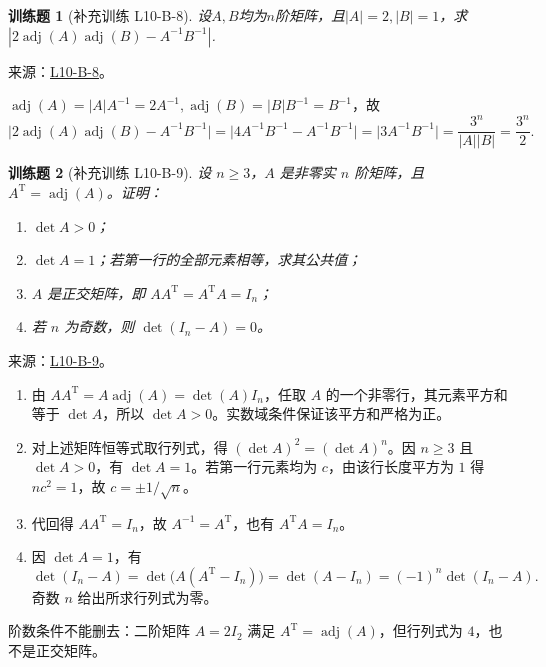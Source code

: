 \documentclass[12pt,fontset=fandol]{ctexart}
\newtheorem{exercise}{训练题}[section]
\begin{document}
\begin{exercise}[补充训练 L10-B-8]\label{prob:L10-B-8}
设$A,B$均为$n$阶矩阵，且$|A|=2,|B|=1$，求$|2\operatorname{adj}(A)\operatorname{adj}(B)-A^{-1}B^{-1}|$.
\end{exercise}
\noindent 来源：\href{https://github.com/yhwu-is/Linear-Algebra-Left-Undone/blob/new/%E8%AE%B2%E4%B9%89/%E4%B8%93%E9%A2%98/10%20%E8%A1%8C%E5%88%97%E5%BC%8F.tex}{L10-B-8}。
\begin{solve}
$\operatorname{adj}(A) = \lvert A \rvert A^{-1} = 2A^{-1}, \operatorname{adj}(B) = \lvert B \rvert B^{-1} = B^{-1}$，故 \[\lvert 2\operatorname{adj}(A)\operatorname{adj}(B)-A^{-1}B^{-1} \rvert = \lvert 4A^{-1}B^{-1}-A^{-1}B^{-1} \rvert = \lvert 3A^{-1}B^{-1} \rvert = \dfrac{3^n}{\lvert A \rvert \lvert B \rvert} = \dfrac{3^n}{2}.\]
\end{solve}

\begin{exercise}[补充训练 L10-B-9]\label{prob:L10-B-9}
设 $n\ge3$，$A$ 是非零实 $n$ 阶矩阵，且 $A^{\mathrm T}=\operatorname{adj}(A)$。证明：
\begin{enumerate}
\item $\det A>0$；
\item $\det A=1$；若第一行的全部元素相等，求其公共值；
\item $A$ 是正交矩阵，即 $AA^{\mathrm T}=A^{\mathrm T}A=I_n$；
\item 若 $n$ 为奇数，则 $\det(I_n-A)=0$。
\end{enumerate}
\end{exercise}
\noindent 来源：\href{https://github.com/yhwu-is/Linear-Algebra-Left-Undone/blob/new/%E8%AE%B2%E4%B9%89/%E4%B8%93%E9%A2%98/10%20%E8%A1%8C%E5%88%97%E5%BC%8F.tex}{L10-B-9}。
\begin{solve}
\begin{enumerate}
\item 由 $AA^{\mathrm T}=A\operatorname{adj}(A)=\det(A)I_n$，任取 $A$ 的一个非零行，其元素平方和等于 $\det A$，所以 $\det A>0$。实数域条件保证该平方和严格为正。
\item 对上述矩阵恒等式取行列式，得 $(\det A)^2=(\det A)^n$。因 $n\ge3$ 且 $\det A>0$，有 $\det A=1$。若第一行元素均为 $c$，由该行长度平方为 $1$ 得 $nc^2=1$，故 $c=\pm1/\sqrt n$。
\item 代回得 $AA^{\mathrm T}=I_n$，故 $A^{-1}=A^{\mathrm T}$，也有 $A^{\mathrm T}A=I_n$。
\item 因 $\det A=1$，有
\[\det(I_n-A)=\det\bigl(A(A^{\mathrm T}-I_n)\bigr)=\det(A-I_n)=(-1)^n\det(I_n-A).\]
奇数 $n$ 给出所求行列式为零。
\end{enumerate}
阶数条件不能删去：二阶矩阵 $A=2I_2$ 满足 $A^{\mathrm T}=\operatorname{adj}(A)$，但行列式为 $4$，也不是正交矩阵。
\end{solve}
\end{document}
